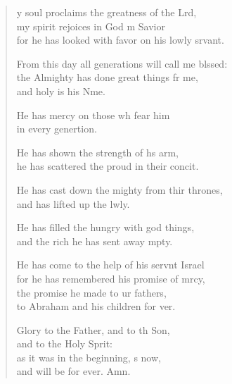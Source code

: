 \settowidth{\versewidth}{From this day all generations will call me blessed: +}
\begin{verse}%
  \begin{patverse}
y soul proclaims the greatness of the Lrd,\Flex\\
my spirit rejoices in God m Savior\Med\\
for he has looked with favor on his lowly srvant.

From this day all generations will call me blssed:\Flex\\
the Almighty has done great things fr me,\Med\\
and holy is his Nme.

He has mercy on those wh fear him\Med\\
in every genertion.

He has shown the strength of h\pointup{\i}s arm,\Med\\
he has scattered the proud in their concit.

He has cast down the mighty from thir thrones,\Med\\
and has lifted up the lwly.

He has filled the hungry with god things,\Med\\
and the rich he has sent away mpty.

He has come to the help of his servnt Israel\Med\\
for he has remembered his promise of mrcy,\\
the promise he made to ur fathers,\Med\\
to Abraham and his children for ver.

Glory to the Father, and to th Son,\Med\\
and to the Holy Sp\pointup{\i}rit:\\
as it was in the beginning, \pointup{\i}s now,\Med\\
and will be for ever. Amn.
  \end{patverse}
\end{verse}
